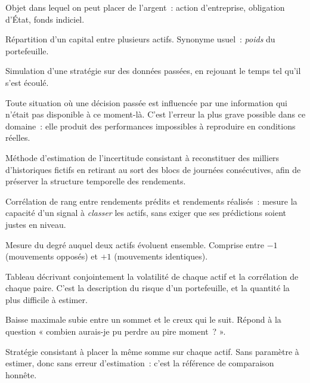 \begin{description}\setlength{\itemsep}{0.35em}

\item[Actif] Objet dans lequel on peut placer de l'argent~: action d'entreprise,
obligation d'État, fonds indiciel.

\item[Allocation] Répartition d'un capital entre plusieurs actifs. Synonyme
usuel~: \emph{poids} du portefeuille.

\item[Backtest] Simulation d'une stratégie sur des données passées, en rejouant
le temps tel qu'il s'est écoulé.

\item[Biais de survivance / de vision du futur] Toute situation où une décision
passée est influencée par une information qui n'était pas disponible à ce
moment-là. C'est l'erreur la plus grave possible dans ce domaine~: elle produit
des performances impossibles à reproduire en conditions réelles.

\item[Bootstrap à blocs] Méthode d'estimation de l'incertitude consistant à
reconstituer des milliers d'historiques fictifs en retirant au sort des blocs de
journées consécutives, afin de préserver la structure temporelle des rendements.

\item[Coefficient d'information] Corrélation de rang entre rendements prédits et
rendements réalisés~: mesure la capacité d'un signal à \emph{classer} les actifs,
sans exiger que ses prédictions soient justes en niveau.

\item[Corrélation] Mesure du degré auquel deux actifs évoluent ensemble. Comprise
entre $-1$ (mouvements opposés) et $+1$ (mouvements identiques).

\item[Covariance (matrice de)] Tableau décrivant conjointement la volatilité de
chaque actif et la corrélation de chaque paire. C'est la description du risque
d'un portefeuille, et la quantité la plus difficile à estimer.

\item[\emph{Drawdown} (perte maximale)] Baisse maximale subie entre un sommet et
le creux qui le suit. Répond à la question « combien aurais-je pu perdre au pire
moment~? ».

\item[Équipondération (1/N)] Stratégie consistant à placer la même somme sur
chaque actif. Sans paramètre à estimer, donc sans erreur d'estimation~: c'est la
référence de comparaison honnête.


\end{description}
